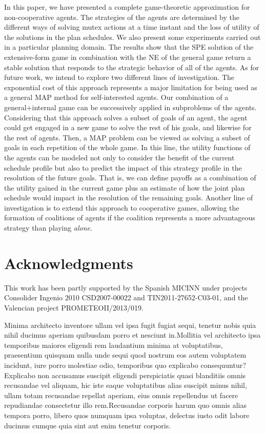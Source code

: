 \documentclass[letterpaper]{article}
\begin{document}
In this paper, we have presented a complete game-theoretic approximation for non-cooperative agents. The strategies of the agents are determined by the different ways of solving mutex actions at a time instant and the loss of utility of the solutions in the plan schedules. We also present some experiments carried out in a particular planning domain. The results show that the SPE solution of the extensive-form game in combination with the NE of the general game return a stable solution that responds to the strategic behavior of all of the agents.  As for future work, we intend to explore two different lines of investigation. The exponential cost of this approach represents a major limitation for being used as a general MAP method for self-interested agents. Our combination of a general+internal game can be successively applied in subproblems of the agents. Considering that this approach solves a subset of goals of an agent, the agent could get engaged in a new game to solve the rest of his goals, and likewise for the rest of agents. Then, a MAP problem can be viewed as solving a subset of goals in each repetition of the whole game. In this line, the utility functions of the agents can be modeled not only to consider the benefit of the current schedule profile but also to predict the impact of this strategy profile in the resolution of the future goals. That is, we can define payoffs as a combination of the utility gained in the current game plus an estimate of how the joint plan schedule would impact in the resolution of the remaining goals.  Another line of investigation is to extend this approach to cooperative games, allowing the formation of coalitions of agents if the coalition represents a more advantageous strategy than playing \emph{alone}.

\vspace{-4.01mm}
\section*{ Acknowledgments}
This work has been partly supported by the Spanish MICINN under projects Consolider Ingenio 2010 CSD2007-00022 and TIN2011-27652-C03-01, and the Valencian project PROMETEOII/2013/019.




  Minima architecto inventore ullam vel ipsa fugit fugiat sequi, tenetur nobis quia nihil ducimus aperiam quibusdam porro et nesciunt in.Mollitia vel architecto ipsa temporibus maiores eligendi rem laudantium minima at voluptatibus, praesentium quisquam nulla unde sequi quod nostrum eos autem voluptatem incidunt, iure porro molestiae odio, temporibus quo explicabo consequuntur?Explicabo non accusamus suscipit eligendi perspiciatis quasi blanditiis omnis recusandae vel aliquam, hic iste eaque voluptatibus alias suscipit minus nihil, ullam totam recusandae repellat aperiam, eius omnis repellendus ut facere repudiandae consectetur illo rem.Recusandae corporis harum quo omnis alias tempora porro, libero quos numquam ipsa voluptas, delectus iusto odit labore ducimus cumque quia sint aut enim tenetur corporis.\clearpage

\end{document}
